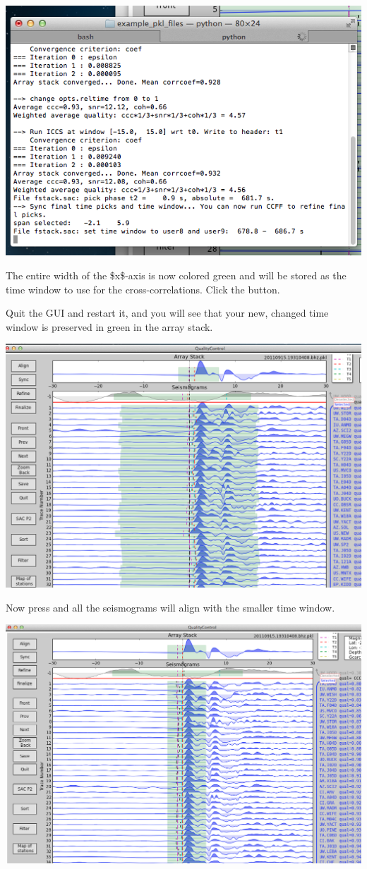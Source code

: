 \documentclass[letterpaper,10pt,english]{sphinxmanual}
\begin{document}
\includegraphics{saved-smaller-time-window.png}

The entire width of the \$x\$-axis is now colored green and will be stored as the time window to use for the cross-correlations. Click the  button.

Quit the GUI and restart it, and you will see that your new, changed time window is preserved in green in the array stack.

\includegraphics{before-refine-reduced-time-window.png}

Now press  and all the seismograms will align with the smaller time window.

\includegraphics{after-refine-reduced-time-window.png}
\end{document}
